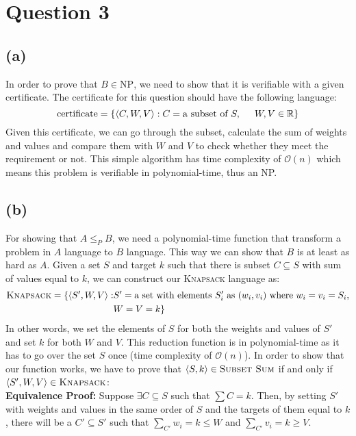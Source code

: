 \section{Question 3}
\subsection{(a)}
In order to prove that $B \in \text{NP}$, we need to show that it is verifiable with a given certificate.
The certificate for this question should have the following language:
\[\text{certificate}=\{\langle C, W, V \rangle : C = \text{a subset of } S, \hspace{5mm} W,V \in \mathbb{R}\}\]
Given this certificate, we can go through the subset, calculate the sum of weights and values and compare them with $W$ and $V$ to
check whether they meet the requirement or not. This simple algorithm has time complexity of $\mathcal{O}(n)$ which means
this problem is verifiable in polynomial-time, thus an NP. 
\subsection{(b)}
For showing that $A \leq_P B$, we need a polynomial-time function that transform a problem in $A$ language to $B$ language.
This way we can show that $B$ is at least as hard as $A$. Given a set $S$ and target $k$ such that there is subset $C \subseteq S$ with sum
of values equal to $k$, we can construct our \textsc{Knapsack} language as:
\begin{equation}
    \begin{aligned}
        \textsc{Knapsack}=\{\langle S', W, V \rangle : & S' = \text{a set with elements } S'_i \text{ as } (w_i, v_i) \text{ where } w_i=v_i=S_i, \\
        & W=V=k\}
    \end{aligned}
\end{equation}
In other words, we set the elements of $S$ for both the weights and values of $S'$ and set $k$ for both $W$ and $V$. This reduction function is in polynomial-time
as it has to go over the set $S$ once (time complexity of $\mathcal{O}(n)$). In order to show that our function works, we have to prove that
$\langle S, k \rangle \in \textsc{Subset Sum}$ if and only if $\langle S', W, V \rangle \in \textsc{Knapsack}$: \\

\textbf{Equivalence Proof:} Suppose $\exists C \subseteq S$ such that $\sum C = k$. Then, by setting $S'$ with weights and values in the same order of $S$ and the targets of them equal to $k$, there will be a 
$C' \subseteq S'$ such that $\sum_{C'}w_i=k\leq W$ and $\sum_{C'}v_i=k\geq V$.

